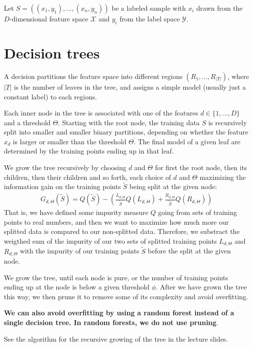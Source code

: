 \documentclass[12pt]{article}
\begin{document}
Let $S = ((x_1,y_1),...,(x_n,y_n))$ be a labeled sample with $x_i$ drawn from the $D$-dimensional feature space $\mathcal{X}$ and $y_i$ from the label space $\mathcal{Y}$.

\section{Decision trees}

A decision partitions the feature space into different regions $(R_1,...,R_{|T|})$, where $|T|$ is the number of leaves in the tree, and assigns a simple model (usually just a constant label) to each regions.

Each inner node in the tree is associated with one of the features $d\in \{1,...,D\}$ and a threshold $\Theta$. Starting with the root node, the training data $S$ is recursively split into smaller and smaller binary partitions, depending on whether the feature $x_d$ is larger or smaller than the threshold $\Theta$. The final model of a given leaf are determined by the training points ending up in that leaf.

We grow the tree recursively by choosing $d$ and $\Theta$ for first the root node, then its children, then their children and so forth, each choice of $d$ and $\Theta$ maximizing the information gain on the training points $\tilde{S}$ being split at the given node:
\begin{align}
G_{d,\Theta}(\tilde{S}) = Q(\tilde{S}) - \left(\frac{L_{d,\Theta}}{\tilde{S}}Q(L_{d,\Theta}) + \frac{R_{d,\Theta}}{\tilde{S}}Q(R_{d,\Theta}) \right)
\end{align}
That is, we have defined some impurity measure $Q$ going from sets of training points to real numbers, and then we want to maximize how much more our splitted data is compared to our non-splitted data. Therefore, we substract the weigthed sum of the impurity of our two sets of splitted training points $L_{d,\Theta}$ and $R_{d,\Theta}$ with the impurity of our training points $\tilde{S}$ before the split at the given node.

We grow the tree, until each node is pure, or the number of training points ending up at the node is below a given threshold $\phi$. After we have grown the tree this way, we then prune it to remove some of its complexity and avoid overfitting.

\textbf{We can also avoid overfitting by using a random forest instead of a single decision tree. In random forests, we do not use pruning}.

See the algorithm for the recursive growing of the tree in the lecture slides.
\end{document}
